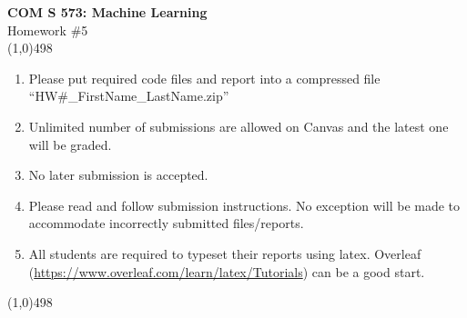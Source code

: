 \documentclass[11pt]{article}
\begin{document}
\begin{center}
{\Large \textbf{COM S 573: Machine Learning}\\Homework \#5}\\

\linethickness{1mm}\line(1,0){498}

\begin{enumerate}
\item Please put required code files and report into a
compressed file ``HW\#\_FirstName\_LastName.zip''
\item Unlimited number of submissions are
allowed on Canvas and the latest one will be graded.
\item {\color{red} No later submission is accepted.}
\item Please read and follow submission instructions. No exception
will be made to accommodate incorrectly submitted files/reports.
\item All students are required to typeset their reports using
latex. Overleaf
(\url{https://www.overleaf.com/learn/latex/Tutorials}) can be a
good start.
\end{enumerate}

\linethickness{1mm}\line(1,0){498}

\end{center}


\end{document}
